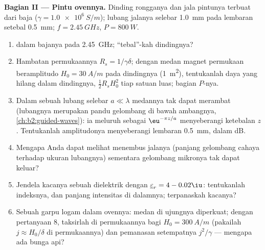 \begin{problem}
\medskip
\noindent\textbf{Bagian II --- Pintu ovennya.}
Dinding rongganya dan jala pintunya terbuat dari baja ($\gamma = \qty{1.0e6}{S/m}$);
lubang jalanya selebar \qty{1.0}{mm} pada lembaran setebal \qty{0.5}{mm};
$f = \qty{2.45}{GHz}$, $P = \qty{800}{W}$.
\begin{enumerate}[resume]
  \item {} dalam bajanya pada \qty{2.45}{GHz}; ``tebal''-kah dindingnya?
  \item Hambatan permukaannya $R_s = 1/\gamma\delta$; dengan medan magnet
        permukaan beramplitudo $H_0 = \qty{30}{A/m}$ pada dindingnya (\qty{1}{m^2}),
        tentukanlah daya yang hilang dalam dindingnya, $\tfrac12R_sH_0^2$ tiap satuan luas; bagian
        $P$-nya.
  \item Dalam sebuah lubang selebar $a \ll \lambda$ medannya tak dapat merambat (lubangnya
        merupakan pandu gelombang di bawah ambangnya, \cref{ch:b2:guided-waves}):
        ia meluruh sebagai $\eu^{-\pi z/a}$ menyeberangi ketebalan $z$. Tentukanlah 
        amplitudonya menyeberangi lembaran \qty{0.5}{mm}, dalam dB.
  \item Mengapa Anda dapat melihat menembus jalanya (panjang gelombang cahaya
        terhadap ukuran lubangnya) sementara gelombang mikronya tak dapat keluar?
  \item Jendela kacanya sebuah dielektrik dengan $\underline\varepsilon_r = 4 - 0.02\iu$:
        tentukanlah indeksnya, dan panjang  intensitas di dalamnya; terpanaskah
        kacanya?
  \item Sebuah garpu logam dalam ovennya: medan di ujungnya diperkuat;
        dengan  pertanyaan 8, taksirlah 
        di permukaannya bagi $H_0 = \qty{300}{A/m}$ (pakailah $j \approx H_0/\delta$
        di permukaannya) dan pemanasan setempatnya $j^2/\gamma$ --- mengapa ada bunga api?
\end{enumerate}


\end{problem}
